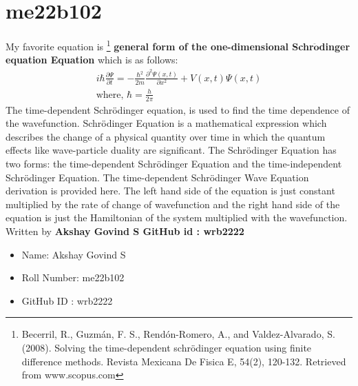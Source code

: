 \section{me22b102}
My favorite equation is \footnote[1]{Becerril, R., Guzmán, F. S., Rendón-Romero, A., and Valdez-Alvarado, S. (2008). Solving the time-dependent schrödinger equation using finite difference methods. Revista Mexicana De Fisica E, 54(2), 120-132. Retrieved from www.scopus.com } \textbf{general form of the one-dimensional  Schr$\mathbf{\ddot{o}}$dinger equation  Equation} which is as follows: 
\begin{eqnarray}
    \label{Schrodinger's equation}
    i\hbar{\frac{\partial \Psi}{\partial t}} = {-\frac{\hbar^2}{2m}} {\frac{\partial^2 \Psi(x,t)}{\partial x^2}} + V(x,t)\Psi(x,t)
    \\ \textrm{where, } \hbar = \frac{h}{2 \pi}    
\end{eqnarray}
The time-dependent Schrödinger equation, is used to find the time dependence of the wavefunction.
Schrödinger Equation is a mathematical expression which describes the change of a physical quantity
over time in which the quantum effects like wave-particle duality are significant. The Schrödinger
Equation has two forms: the time-dependent Schrödinger Equation and the time-independent Schrödinger
Equation. The time-dependent Schrödinger Wave Equation derivation is provided here. The left hand side 
of the equation is just constant multiplied by the rate of change of wavefunction and the right hand side 
of the equation is just the Hamiltonian of the system multiplied with the wavefunction. Written by \textbf{Akshay Govind S 
GitHub id : wrb2222}

\begin{itemize}
    \item Name: Akshay Govind S 
    \item Roll Number: me22b102
    \item GitHub ID : wrb2222
\end{itemize}



